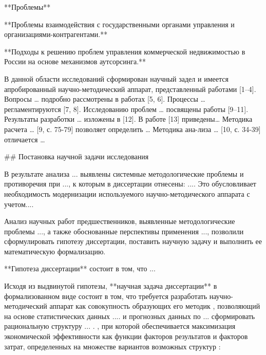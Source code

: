 **Проблемы**

**Проблемы взаимодействия с государственными органами управления и организациями-контрагентами.**

**Подходы к решению проблем управления коммерческой недвижимостью в России на основе механизмов аутсорсинга.**

В данной области исследований сформирован научный задел и имеется апробированный научно-методический аппарат, представленный работами [1–4]. Вопросы … подробно рассмотрены в работах [5, 6]. Процессы … регламентируются [7, 8]. Исследованию проблем … посвящены работы [9–11]. Результаты разработки … изложены в [12]. В работе [13] приведены… 
Методика расчета … [9, с. 75-79] позволяет определить … Методика ана-лиза … [10, с. 34-39] отличается … 

## Постановка научной задачи исследования\label{sec:ch1/sect3}

В результате анализа ... выявлены системные методологические проблемы и противоречия при ..., к которым в диссертации отнесены: .... Это обусловливает необходимость модернизации используемого научно-методического аппарата с учетом....

Анализ научных работ предшественников, выявленные методологические проблемы ..., а также обоснованные перспективы применения ..., позволили сформулировать гипотезу диссертации, поставить научную задачу и выполнить ее математическую формализацию.

**Гипотеза диссертации** состоит в том, что ...

Исходя из выдвинутой гипотезы, **научная задача диссертации** в формализованном виде состоит в том, что требуется разработать научно-методический аппарат  как совокупность образующих его методик , позволяющий на основе статистических данных ....  и прогнозных данных по ...  сформировать рациональную структуру ... . , при которой обеспечивается максимизация экономической эффективности  как функции факторов результатов  и факторов затрат, определенных на множестве вариантов возможных структур :


